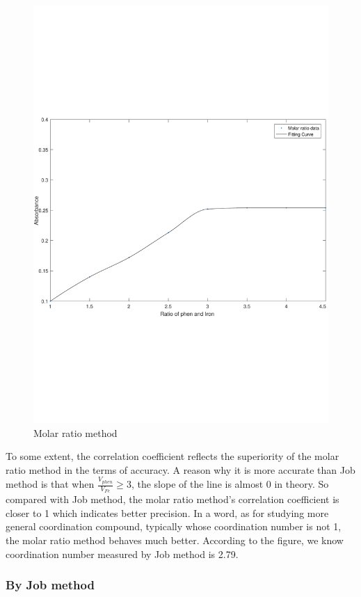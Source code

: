 \begin{figure}[H]
	\includegraphics[width=\linewidth]{Fig2.pdf}
	\caption{Molar ratio method}
	\label{fig2}
\end{figure}

To some extent, the correlation coefficient reflects the superiority of the molar ratio method in the terms of accuracy. A reason why it is more accurate than Job method is that when $\frac{V_{phen}}{V_{Fe}}\geq3$, the slope of the line is almost 0 in theory. So compared with Job method, the molar ratio method’s correlation coefficient is closer to 1 which indicates better precision. In a word, as for studying more general coordination compound, typically whose coordination number is not 1, the molar ratio method behaves much better. According to the figure, we know coordination number measured by Job method is 2.79.

\subsubsection{By Job method}

